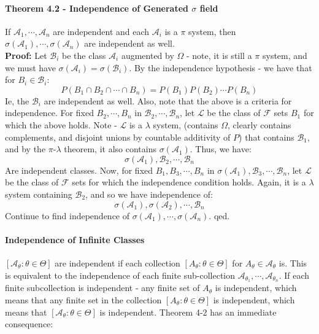 \documentclass[12pt,a4paper]{article}
\newcommand{\1}[1]{\mathbbm{1}\left\{ #1 \right\}}
\newcommand{\acal}{\mathcal{A}}
\newcommand{\lcal}{\mathcal{L}}
\newcommand{\fcal}{\mathcal{F}}
\newcommand{\bcal}{\mathcal{B}}
\begin{document}
\paragraph{Theorem 4.2 - Independence of Generated $\sigma$ field} If $\acal_1, \cdots, \acal_n$ are independent and each $\acal_i$ is a $\pi$ system, then $\sigma(\acal_1), \cdots, \sigma(\acal_n)$ are independent as well.
\\
\textbf{Proof:} Let $\bcal_i$ be the class $\acal_i$ augmented by $\Omega$ - note, it is still a $\pi$ system, and we must have $\sigma(\acal_i) = \sigma(\bcal_i)$. By the independence hypothesis - we have that for $B_i \in \bcal_i$:
$$
	P(B_1 \cap B_2 \cap \cdots \cap B_n) = P(B_1)P(B_2) \cdots P(B_n)
$$
Ie, the $\bcal_i$ are independent as well. Also, note that the above is a criteria for independence. For fixed $B_2, \cdots, B_n$ in $\bcal_2, \cdots, \bcal_n$, let $\lcal$ be the class of $\fcal$ sets $B_1$ for which the above holds. Note - $\lcal$ is a $\lambda$ system, (contains $\Omega$, clearly contains complements, and disjoint unions by countable additivity of $P$) that contains $\bcal_1$, and by the $\pi$-$\lambda$ theorem, it also contains $\sigma(\acal_1)$. Thus, we have:
$$
	\sigma(\acal_1), \bcal_2, \cdots, \bcal_n
$$
Are independent classes. Now, for fixed $B_1, B_3, \cdots, B_n$ in $\sigma(\acal_1), \bcal_3, \cdots, \bcal_n$, let $\lcal$ be the class of $\fcal$ sets for which the independence condition holds. Again, it is a $\lambda$ system containing $\bcal_2$, and so we have independence of:
$$
	\sigma(\acal_1), \sigma(\acal_2), \cdots, \bcal_n
$$
Continue to find independence of $\sigma(\acal_1), \cdots, \sigma(\acal_n)$. qed.

\paragraph{Independence of Infinite Classes} $[\acal_\theta : \theta \in \Theta]$ are independent if each collection $[A_\theta : \theta \in \Theta]$ for $A_\theta \in \acal_\theta$ is. This is equivalent to the independence of each finite sub-collection $\acal_{\theta_1}, \cdots, \acal_{\theta_n}$. If each finite subcollection is independent - any finite set of $A_\theta$ is independent, which means that any finite set in the collection $[A_\theta : \theta \in \Theta]$ is independent, which means that $[\acal_\theta : \theta \in \Theta]$ is independent. Theorem 4-2 has an immediate consequence:
\end{document}
